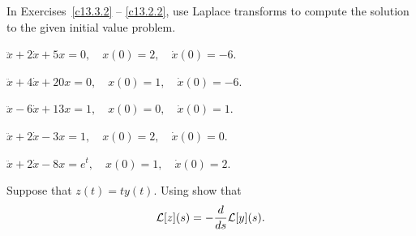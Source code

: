 \documentclass{ximera}
\begin{document}
\noindent In Exercises~\ref{c13.3.2} -- \ref{c13.2.2}, use Laplace transforms 
to compute the solution to the given initial value problem.
\begin{exercise} \label{c13.3.2}
$\ddot{x} + 2\dot x +5x = 0, \quad x(0) = 2, \quad \dot{x}(0) = -6$.
\end{exercise}
\begin{exercise} \label{c13.4.3a}
$\ddot x +4\dot x +20 x=0,\quad x(0)=1,\quad \dot{x}(0)=-6$.
\end{exercise}
\begin{exercise} \label{c13.4.3b}
$\ddot x -6\dot x +13 x=1,\quad x(0)=0,\quad \dot{x}(0)=1$.
\end{exercise}
\begin{exercise} \label{c13.2.1}
$\ddot{x} + 2\dot{x} - 3x  =  1, \quad x(0) = 2, \quad \dot{x}(0) = 0$.
\end{exercise}
\begin{exercise} \label{c13.2.2}
$\ddot{x} + 2\dot{x} - 8x = e^t, \quad x(0) = 1, \quad \dot{x}(0) = 2$.
\end{exercise}

\begin{exercise} \label{c13.1.2}
Suppose that $z(t)=ty(t)$.  Using  show that
\[
{\cal L}[z](s) = -\frac{\displaystyle d}{\displaystyle ds} {\cal L}[y](s).
\]
\end{exercise}
\end{document}
